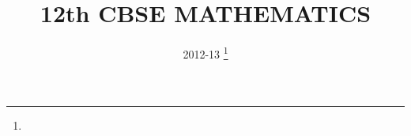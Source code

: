 \documentclass[journal,12pt,twocolumn]{IEEEtran}
\DeclareMathOperator*{\Res}{Res}
\begin{document}
\newtheorem{theorem}{Theorem}[section]
\newtheorem{problem}{Problem}
\newtheorem{proposition}{Proposition}[section]
\newtheorem{lemma}{Lemma}[section]
\newtheorem{corollary}[theorem]{Corollary}
\newtheorem{example}{Example}[section]
\newtheorem{definition}[problem]{Definition}
\newcommand{\BEQA}{\begin{eqnarray}}
\newcommand{\EEQA}{\end{eqnarray}}
\newcommand{\define}{\stackrel{\triangle}{=}}

\providecommand{\mbf}{\mathbf}
\providecommand{\pr}[1]{\ensuremath{\Pr\left(#1\right)}}
\providecommand{\qfunc}[1]{\ensuremath{Q\left(#1\right)}}
\providecommand{\sbrak}[1]{\ensuremath{{}\left[#1\right]}}
\providecommand{\lsbrak}[1]{\ensuremath{{}\left[#1\right.}}
\providecommand{\rsbrak}[1]{\ensuremath{{}\left.#1\right]}}
\providecommand{\brak}[1]{\ensuremath{\left(#1\right)}}
\providecommand{\lbrak}[1]{\ensuremath{\left(#1\right.}}
\providecommand{\rbrak}[1]{\ensuremath{\left.#1\right)}}
\providecommand{\cbrak}[1]{\ensuremath{\left\{#1\right\}}}
\providecommand{\lcbrak}[1]{\ensuremath{\left\{#1\right.}}
\providecommand{\rcbrak}[1]{\ensuremath{\left.#1\right\}}}
\theoremstyle{remark}
\newtheorem{rem}{Remark}
\newcommand{\sgn}{\mathop{\mathrm{sgn}}}
\providecommand{\abs}[1]{\left\vert#1\right\vert}
\providecommand{\res}[1]{\Res\displaylimits_{#1}} 
\providecommand{\norm}[1]{\left\lVert#1\right\rVert}
\providecommand{\mtx}[1]{\mathbf{#1}}
\providecommand{\mean}[1]{E\left[ #1 \right]}
\providecommand{\fourier}{\overset{\mathcal{F}}{ \rightleftharpoons}}
\providecommand{\system}{\overset{\mathcal{H}}{ \longleftrightarrow}}
\newcommand{\solution}{\noindent \textbf{Solution: }}
\newcommand{\cosec}{\,\text{cosec}\,}
\providecommand{\dec}[2]{\ensuremath{\overset{#1}{\underset{#2}{\gtrless}}}}
\newcommand{\myvec}[1]{\ensuremath{\begin{pmatrix}#1\end{pmatrix}}}
\newcommand{\mydet}[1]{\ensuremath{\begin{vmatrix}#1\end{vmatrix}}}
\makeatletter
{}
\makeatother
\let\StandardTheFigure\thefigure
\let\vec\mathbf
\renewcommand{\thefigure}{\theproblem}
\def\putbox#1#2#3{\makebox[0in][l]{\makebox[#1][l]{}\raisebox{\baselineskip}[0in][0in]{\raisebox{#2}[0in][0in]{#3}}}}
     \def\rightbox#1{\makebox[0in][r]{#1}}
     \def\centbox#1{\makebox[0in]{#1}}
     \def\topbox#1{\raisebox{-\baselineskip}[0in][0in]{#1}}
     \def\midbox#1{\raisebox{-0.5\baselineskip}[0in][0in]{#1}}
\vspace{3cm}
\title{
	12th CBSE MATHEMATICS
}
\author{ 2012-13
	\thanks{}
	
}
\maketitle
\newpage
\bigskip
\renewcommand{\thefigure}{\theenumi}
\renewcommand{\thetable}{\theenumi}
\end{document}

